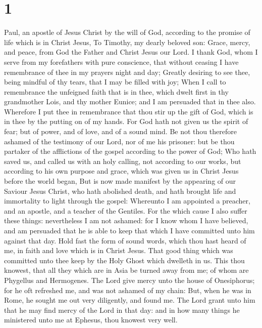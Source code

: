 \hypertarget{section}{%
\section{1}\label{section}}

 Paul, an apostle of Jesus Christ by the will of God,
according to the promise of life which is in Christ Jesus,
 To Timothy, my dearly beloved son: Grace, mercy, and
peace, from God the Father and Christ Jesus our Lord.  I
thank God, whom I serve from my forefathers with pure conscience, that
without ceasing I have remembrance of thee in my prayers night and day;
 Greatly desiring to see thee, being mindful of thy tears,
that I may be filled with joy;  When I call to remembrance
the unfeigned faith that is in thee, which dwelt first in thy
grandmother Lois, and thy mother Eunice; and I am persuaded that in thee
also.  Wherefore I put thee in remembrance that thou stir
up the gift of God, which is in thee by the putting on of my hands.
 For God hath not given us the spirit of fear; but of
power, and of love, and of a sound mind.  Be not thou
therefore ashamed of the testimony of our Lord, nor of me his prisoner:
but be thou partaker of the afflictions of the gospel according to the
power of God;  Who hath saved us, and called us with an
holy calling, not according to our works, but according to his own
purpose and grace, which was given us in Christ Jesus before the world
began,  But is now made manifest by the appearing of our
Saviour Jesus Christ, who hath abolished death, and hath brought life
and immortality to light through the gospel:  Whereunto I
am appointed a preacher, and an apostle, and a teacher of the Gentiles.
 For the which cause I also suffer these things:
nevertheless I am not ashamed: for I know whom I have believed, and am
persuaded that he is able to keep that which I have committed unto him
against that day.  Hold fast the form of sound words,
which thou hast heard of me, in faith and love which is in Christ Jesus.
 That good thing which was committed unto thee keep by
the Holy Ghost which dwelleth in us.  This thou knowest,
that all they which are in Asia be turned away from me; of whom are
Phygellus and Hermogenes.  The Lord give mercy unto the
house of Onesiphorus; for he oft refreshed me, and was not ashamed of my
chain:  But, when he was in Rome, he sought me out very
diligently, and found me.  The Lord grant unto him that
he may find mercy of the Lord in that day: and in how many things he
ministered unto me at Ephesus, thou knowest very well.

